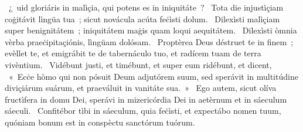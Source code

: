 {  }
{%
~¿~uid gloriáris in malìçia, qui potens es in iniquitáte~? 
~Tota die injustìçiam coġitávit lìngüa tua~; sicut novácula acúta feċìsti dolum. 
~Dilexìsti malìçiam super benignitátem~; iniquitátem maġis quam loqui aequitátem. 
~Dilexìsti òmnia vèrba praeċipitaçiónis, lìngüam dolósam. 
~Proptèrea Deus déstruet te in finem~; evèllet te, et emigrábit te de tabernáculo tuo, et radícem tuam de terra vivèntium. 
~Vidébunt justi, et timébunt, et super eum ridébunt, et dicent, 
~«~Ecċe hòmo qui non pósuit Deum adjutórem suum, sed sperávit in multitúdine diviçiárum suárum, et praeváluit in vanitáte sua.~»
~Ego autem, sicut olíva fructìfera in domu Dei, sperávi in mizericórdia Dei in aetèrnum et in sáeculum sáeculi. 
~Confitébor tìbi in sáeculum, quia feċìsti, et expectábo nomen tuum, quóniam bonum est in conspèctu sanctórum tuórum. 
}

